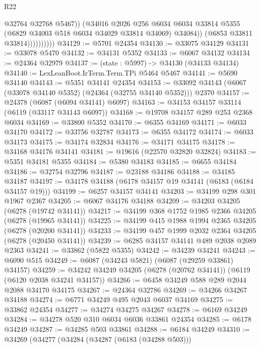 \begin{lexlean}{R22}
\begin{coremodule}
                            @32764
                            @32768
                            @5467))
                        (@34016
                          @2026
                          @256
                          @6034
                          @6034
                          @33814
                          @5355
                          (@6829 @34003 @518 @6034 @34029 @33814 @34069)
                          @34084))
                      (@6853 @33811 @33814))))))))))
@34129 := @5701 @24354
@34130 := @33075 @34129
@34131 := @33078 @5470
@34132 := @34131 @5352
@34133 := @6067 @34132
@34134 := @24364 @32979
@34137 := (state : @5997) -> @34130 (@34133 @34134)
@34140 := LexLeanBoot.IrTerm.Term.TPi @5464 @5467
@34141 := @5690 @34140
@34143 := @5351 @34141 @24354
@34153 := @33092 @34143 (@6067 (@33078 @34140 @5352) (@24364 (@32755 @34140 @5352))) @2370
@34157 := @24378 (@6087 (@6094 @34141) @6097)
@34163 := @34153 @34157 @33114 (@6119 (@33117 @34143 @6097))
@34168 := @19708 @34157 @289 @253 @2368 @6034
@34169 := @33800 @5352
@34170 := @6355 @34169
@34171 := @6033 @34170
@34172 := @33756 @32787
@34173 := @6355 @34172
@34174 := @6033 @34173
@34175 := @34174 @32834
@34176 := @34171 @34175
@34178 := @34168 @34176 @34141
@34181 := @19616 (@22570 @32820 @32824)
@34183 := @5351 @34181 @5355
@34184 := @5380 @34183
@34185 := @6655 @34184
@34186 := @32754 @32796
@34187 := @23188 @34186
@34188 := @34185 @34187
@34197 := @34178 @34188 (@6178 @34157 @19 @34141 (@6183 (@6184 @34157 @19)))
@34199 := @6257 @34157 @34141
@34203 := @34199 @298 @301 @1967 @2367
@34205 := @6067 @34176 @34188
@34209 := @34203 @34205 (@6278 (@19742 @34141))
@34217 := @34199 @368 @1752 @1985 @2366 @34205 (@6278 (@19965 @34141))
@34225 := @34199 @415 @1988 @1994 @2365 @34205 (@6278 (@20200 @34141))
@34233 := @34199 @457 @1999 @2032 @2364 @34205 (@6278 (@20450 @34141))
@34239 := @6285 @34157 @34141 @489 @2038 @2089 @2363
@34241 := @33862 (@5822 @5355)
@34242 := @34239 @34241
@34243 := @6090 @515
@34249 := @6087 (@34243 @5821) (@6087 (@29259 @33861) @34157)
@34259 := @34242 @34249 @34205 (@6278 (@20762 @34141)) (@6119 (@6120 @2038 @34241 @34157))
@34266 := @6458 @34249 @588 @289 @2044 @2088 @34170 @34175
@34267 := @24364 @32786
@34269 := @34266 @34267 @34188
@34274 := @6771 @34249 @495 @2043 @6037 @34169
@34275 := @33862 @24354
@34277 := @34274 @34275 @34267
@34278 := @6169 @34249
@34284 := @34278 @520 @310 @6034 @6036 @33861 @24354
@34285 := @6178 @34249
@34287 := @34285 @503 @33861
@34288 := @6184 @34249
@34310 := @34269
    (@34277
      (@34284
        (@34287 (@6183 (@34288 @503)))

\end{coremodule}
\end{lexlean}
